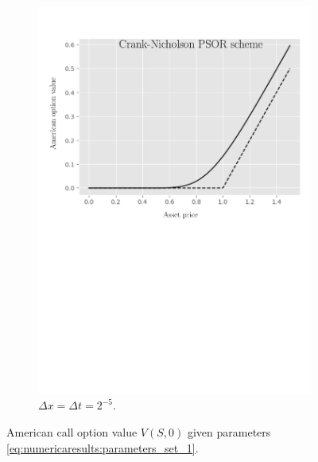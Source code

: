 \begin{figure}[H]
\begin{subfigure}{0.4\textwidth}
    \includegraphics[width=\textwidth]{chapters/chapter5/TestCase1CrankNicholsonLCP.pdf}
    \caption{$\Delta{x}=\Delta{t}=2^{-5}$.}
  \end{subfigure}
  \caption{American call option value $V(S, 0)$ given parameters \eqref{eq:numericaresults:parameters_set_1}.}
  \label{fig:lcp:numericaresults:numericaresults:test_case_1}
\end{figure}
